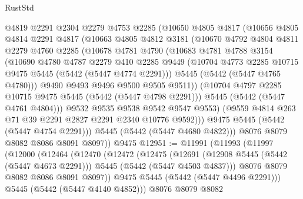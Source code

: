 \begin{lexlean}{RustStd}
\begin{coremodule}
            @4819
            @2291
            @2304
            @2279
            @4753
            @2285
            (@10650
              @4805
              @4817
              (@10656
                @4805
                @4814
                @2291
                @4817
                (@10663
                  @4805
                  @4812
                  @3181
                  (@10670
                    @4792
                    @4804
                    @4811
                    @2279
                    @4760
                    @2285
                    (@10678
                      @4781
                      @4790
                      (@10683
                        @4781
                        @4788
                        @3154
                        (@10690
                          @4780
                          @4787
                          @2279
                          @410
                          @2285
                          @9449
                          (@10704 @4773 @2285 @10715 @9475 @5445 (@5442 (@5447 @4774 @2291)))
                          @5445
                          (@5442 (@5447 @4765 @4780)))
                        @9490
                        @9493
                        @9496
                        @9500
                        @9505
                        @9511))
                    (@10704 @4797 @2285 @10715 @9475 @5445 (@5442 (@5447 @4798 @2291)))
                    @5445
                    (@5442 (@5447 @4761 @4804)))
                  @9532
                  @9535
                  @9538
                  @9542
                  @9547
                  @9553)
                (@9559 @4814 @263 @71 @39 @2291 @2827 @2291 @2340 @10776 @9592)))
            @9475
            @5445
            (@5442 (@5447 @4754 @2291)))
          @5445
          (@5442 (@5447 @4680 @4822)))
        @8076
        @8079
        @8082
        @8086
        @8091
        @8097))
    @9475
@12951 := @11991
    (@11993
      (@11997
        (@12000
          (@12464
            (@12470
              (@12472
                (@12475
                  (@12691
                    (@12908 @5445 (@5442 (@5447 @4673 @2291)))
                    @5445
                    (@5442 (@5447 @4503 @4837)))
                  @8076
                  @8079
                  @8082
                  @8086
                  @8091
                  @8097))
              @9475
              @5445
              (@5442 (@5447 @4496 @2291)))
            @5445
            (@5442 (@5447 @4140 @4852)))
          @8076
          @8079
          @8082

\end{coremodule}
\end{lexlean}
